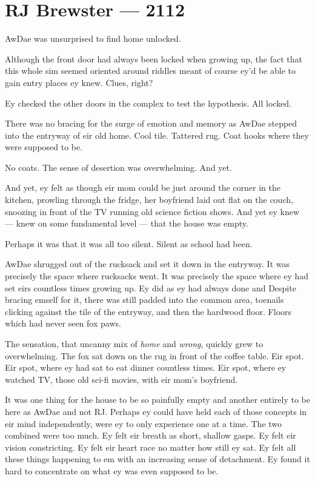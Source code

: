 \hypertarget{rj-brewster-2112}{%
\chapter*{RJ Brewster — 2112}\label{rj-brewster-2112}}

AwDae was unsurprised to find home unlocked.

Although the front door had always been locked when growing up, the fact that this whole sim seemed oriented around riddles meant of course ey'd be able to gain entry places ey knew. Clues, right?

Ey checked the other doors in the complex to test the hypothesis. All locked.

There was no bracing for the surge of emotion and memory as AwDae stepped into the entryway of eir old home. Cool tile. Tattered rug. Coat hooks where they were supposed to be.

No coats. The sense of desertion was overwhelming. And yet.

And yet, ey felt as though eir mom could be just around the corner in the kitchen, prowling through the fridge, her boyfriend laid out flat on the couch, snoozing in front of the TV running old science fiction shows. And yet ey knew — knew on some fundamental level — that the house was empty.

Perhaps it was that it was all too silent. Silent as school had been.

AwDae shrugged out of the rucksack and set it down in the entryway. It was precisely the space where rucksacks went. It was precisely the space where ey had set eirs countless times growing up. Ey did as ey had always done and Despite bracing emself for it, there was still padded into the common area, toenails clicking against the tile of the entryway, and then the hardwood floor. Floors which had never seen fox paws.

The sensation, that uncanny mix of \emph{home} and \emph{wrong}, quickly grew to overwhelming. The fox sat down on the rug in front of the coffee table. Eir spot. Eir spot, where ey had sat to eat dinner countless times. Eir spot, where ey watched TV, those old sci-fi movies, with eir mom's boyfriend.

It was one thing for the house to be so painfully empty and another entirely to be here as AwDae and not RJ. Perhaps ey could have held each of those concepts in eir mind independently, were ey to only experience one at a time. The two combined were too much. Ey felt eir breath as short, shallow gasps. Ey felt eir vision constricting. Ey felt eir heart race no matter how still ey sat. Ey felt all these things happening to em with an increasing sense of detachment. Ey found it hard to concentrate on what ey was even supposed to be.

